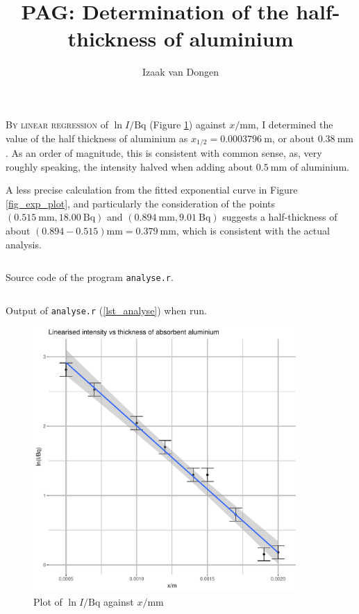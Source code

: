 \documentclass[a4paper,11pt]{article}
\title{PAG: Determination of the half-thickness of aluminium}
\author{Izaak van Dongen}
\newenvironment{longlisting}
{\addvspace{\baselineskip}\captionsetup{type=listing}}
{\addvspace{\baselineskip}}
\begin{document}
    \maketitle%

    \lettrine{B}{y linear regression} of \(\ln I/\si{\becquerel}\) (Figure
    \ref{fig_log_plot}) against \(x/\si{\milli\metre}\), I determined the value
    of the half thickness of aluminium as \(x_{1/2} = \SI{0.0003796}{\metre}\),
    or about \(\SI{0.38}{\milli\metre}\). As an order of magnitude, this is
    consistent with common sense, as, very roughly speaking, the intensity
    halved when adding about \(\SI{0.5}{\milli\metre}\) of aluminium.

    A less precise calculation from the fitted exponential curve in Figure
    \ref{fig_exp_plot}, and particularly the consideration of the points
    \((\SI{0.515}{\milli\metre}, \SI{18.00}{\becquerel})\) and
    \((\SI{0.894}{\milli\metre}, \SI{9.01}{\becquerel})\) suggests a
    half-thickness of about \((0.894 - 0.515)\si{\milli\metre} =
    \SI{0.379}{\milli\metre}\), which is consistent with the actual analysis.

\begin{longlisting}
\inputminted{R}{analyse.r}
\caption{Source code of the program \texttt{analyse.r}.}
\label{lst_analyse}
\end{longlisting}

\begin{longlisting}
\inputminted{text}{analysis_output.txt}
\caption{Output of \texttt{analyse.r} (\ref{lst_analyse}) when run.}
\label{lst_results}
\end{longlisting}

\begin{figure}[H]
\begin{center}
\includegraphics[width=0.9\textwidth,page=1]{Rplots.pdf}
\end{center}
\caption{Plot of \(\ln I/\si{\becquerel}\) against \(x / \si{\milli\metre}\)}
\label{fig_log_plot}
\end{figure}
\end{document}
